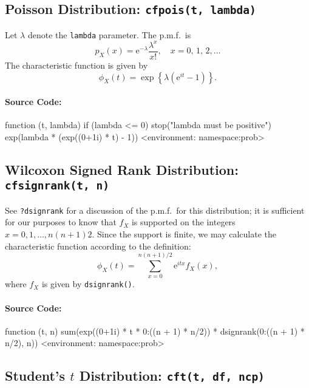 \documentclass[english]{article}
\newcommand{\me}{\mathrm{e}}
\begin{document}
\subsection{Poisson Distribution: \texttt{cfpois(t, lambda)}}

Let $\lambda$ denote the \texttt{lambda} parameter. The p.m.f.~is\[
p_{X}(x)=\me^{-\lambda}\frac{\lambda^{x}}{x!},\quad x=0,\,1,\,2,\ldots\]
The characteristic function is given by\[
\phi_{X}(t)=\exp\left\{ \lambda(\me^{it}-1)\right\} .\]



\paragraph*{Source Code:}

\begin{Schunk}
\begin{Soutput}
function (t, lambda) 
{
    if (lambda <= 0) 
        stop("lambda must be positive")
    exp(lambda * (exp((0+1i) * t) - 1))
}
<environment: namespace:prob>
\end{Soutput}
\end{Schunk}


\subsection{Wilcoxon Signed Rank Distribution: \texttt{cfsignrank(t, n)}}

See \texttt{?dsignrank} for a discussion of the p.m.f.~for this distribution;
it is sufficient for our purposes to know that $f_{X}$ is supported
on the integers $x=0,1,\ldots,n(n+1)2$. Since the support is finite,
we may calculate the characteristic function according to the definition:\[
\phi_{X}(t)=\sum_{x=0}^{n(n+1)/2}\me^{itx}f_{X}(x),\]
where $f_{X}$ is given by \texttt{dsignrank()}.


\paragraph*{Source Code:}

\begin{Schunk}
\begin{Soutput}
function (t, n) 
{
    sum(exp((0+1i) * t * 0:((n + 1) * n/2)) * dsignrank(0:((n + 
        1) * n/2), n))
}
<environment: namespace:prob>
\end{Soutput}
\end{Schunk}


\subsection{Student's $t$ Distribution: \texttt{cft(t, df, ncp)}}
\end{document}
